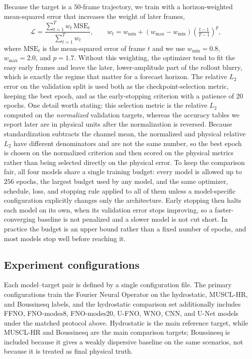 Because the target is a $50$-frame trajectory, we train with a horizon-weighted mean-squared error that increases the weight of later frames,
\[
\mathcal{L} = \frac{\sum_{t = 1} ^ {T} w_t\, \mathrm{MSE}_t}{\sum_{t = 1} ^ {T} w_t},
\qquad
w_t = w_{\min} + (w_{\max} - w_{\min})\left(\tfrac{t - 1}{T - 1}\right) ^ {p},
\]
where $\mathrm{MSE}_t$ is the mean-squared error of frame $t$ and we use $w_{\min} = 0.8$, $w_{\max} = 2.0$, and $p = 1.7$. Without this weighting, the optimizer tend to fit the easy early frames and leave the later, lower-amplitude part of the rollout blurry, which is exactly the regime that matter for a forecast horizon. The relative $L_2$ error on the validation split is used both as the checkpoint-selection metric, keeping the best epoch, and as the early-stopping criterion with a patience of $20$ epochs. One detail worth stating: this selection metric is the relative $L_2$ computed on the \emph{normalized} validation targets, whereas the accuracy tables we report later are in physical units after the normalization is reversed. Because standardization subtracts the channel mean, the normalized and physical relative $L_2$ have different denominators and are not the same number, so the best epoch is chosen on the normalized criterion and then scored on the physical metrics rather than being selected directly on the physical error. To keep the comparison fair, all four models share a single training budget: every model is allowed up to $256$ epochs, the largest budget used by any model, and the same optimizer, schedule, loss, and stopping rule applied to all of them unless a model-specific configuration explicitly changes only the architecture. Early stopping then halts each model on its own, when its validation error stops improving, so a faster-converging baseline is not penalized and a slower model is not cut short. In practice the budget is an upper bound rather than a fixed number of epochs, and most models stop well before reaching it.

\subsection{Experiment configurations}
\label{subsec:train-configs}
Each model--target pair is defined by a single configuration file. The primary configurations train the Fourier Neural Operator on the hydrostatic, MUSCL-HR, and Boussinesq labels, and the hydrostatic comparison set additionally includes FFNO, FNO-modes8, FNO-modes20, U-FNO, WNO, CNN, and U-Net models under the matched protocol above. Hydrostatic is the main reference target, while MUSCL-HR and Boussinesq are the main comparison targets; Boussinesq is included because it gives a weakly dispersive baseline on the same scenarios, not because it is treated as final physical truth.


